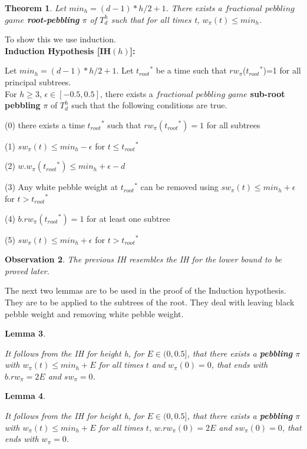 \documentclass[12pt]{article}
\newtheorem{theorem}{Theorem}[subsection]
\newtheorem{lemma}[theorem]{Lemma}
\newtheorem{obs}[theorem]{Observation}
\newcommand{\troots}{{t_{root}}^*}
\begin{document}
\begin{theorem}
Let $min_h = (d-1) * h/2+1$.
There exists a $fractional $ $pebbling$ $game$ {\bf root-pebbling} $\pi$ of $T^h_d$ such
that for all times t, $w_\pi(t) \le min_h$.
\end{theorem}

\noindent
To show this we use induction.\\


\noindent
{\bf Induction Hypothesis [IH$(h)$]:} 


\noindent
Let $min_h = (d-1) * h/2+1$. Let $\troots$ be a time such that $rw_\pi$($\troots$)=1 for all principal subtrees. \\
For $h\geq 3$, $\epsilon \in [-0.5,0.5]$, there exists a $fractional$ $pebbling$ $game$ {\bf sub-root pebbling} $\pi$ of $T_d^h$ such that the following conditions are true. 

(0) there exists a time $\troots$ such that $rw_\pi(\troots)=1$ for all subtrees

(1) $sw_\pi(t) \leq min_h-\epsilon$ for $t \leq \troots$

(2) $w.w_\pi(\troots) \leq min_h+\epsilon - d$

(3) Any white pebble weight at $\troots$ can be removed using $sw_\pi(t) \leq min_h+\epsilon$ for  $t > \troots$ 

(4) $b.rw_\pi(\troots)=1$ for at least one subtree

(5) $sw_\pi(t) \leq min_h+\epsilon$ for  $t > \troots$\\


\begin{obs} 
The previous IH resembles the IH for the lower bound to be proved later.
\end{obs}


The next two lemmas are to be used in the proof of the Induction hypothesis. They are to be applied to the subtrees of the root. They deal with leaving black pebble weight and removing white pebble weight.

\begin{lemma} \label{fup1}

It follows from the IH for height h, for $E \in (0,0.5]$, that there exists a {\bf pebbling} $\pi$ with $w_\pi(t) \leq min_h+E$ for all times $t$ and $w_\pi(0)=0$, that ends with $b.rw_{\pi} = 2E$ and $sw_\pi=0$.
\end{lemma}


\begin{lemma} \label{fup2}

It follows from the IH for height h, for $E \in (0,0.5]$, that there exists a {\bf pebbling} $\pi$ with $w_\pi(t) \leq min_h+E$ for all times $t$,  $w.rw_{\pi}(0) = 2E$  and $sw_\pi(0)=0$, that ends with $w_\pi=0$.
\end{lemma}
\end{document}
